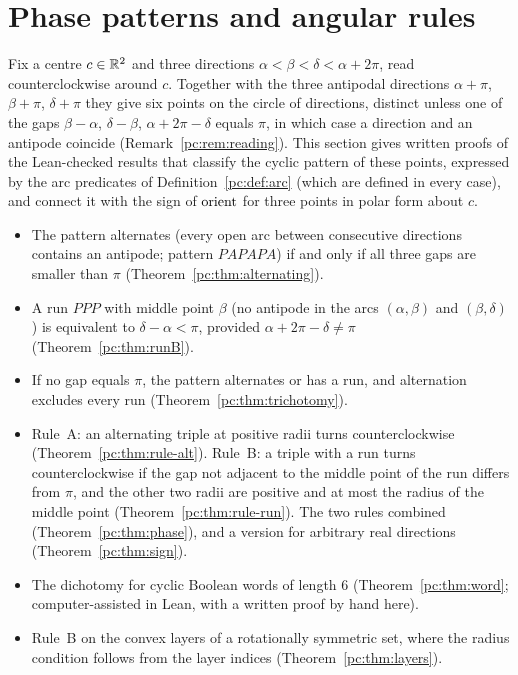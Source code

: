 \section{Phase patterns and angular rules}\label{pc:sec}
\begingroup\sloppy

Fix a centre $c\in\mathbb R^2$ and three directions $\alpha<\beta<\delta<\alpha+2\pi$, read counterclockwise around
$c$. Together with the three antipodal directions $\alpha+\pi$, $\beta+\pi$, $\delta+\pi$ they give six points on
the circle of directions, distinct unless one of the gaps $\beta-\alpha$, $\delta-\beta$, $\alpha+2\pi-\delta$
equals $\pi$, in which case a direction and an antipode coincide (Remark~\ref{pc:rem:reading}). This section gives
written proofs of the Lean-checked results that classify the cyclic pattern of these points, expressed by the arc
predicates of Definition~\ref{pc:def:arc} (which are defined in every case), and connect it with the sign of
$\operatorname{orient}$ for three points in polar form about $c$.
\begin{itemize}
\item The pattern alternates (every open arc between consecutive directions contains an antipode; pattern
  $PAPAPA$) if and only if all three gaps are smaller than $\pi$ (Theorem~\ref{pc:thm:alternating}).
\item A run $PPP$ with middle point $\beta$ (no antipode in the arcs $(\alpha,\beta)$ and $(\beta,\delta)$) is
  equivalent to $\delta-\alpha<\pi$, provided $\alpha+2\pi-\delta\neq\pi$ (Theorem~\ref{pc:thm:runB}).
\item If no gap equals $\pi$, the pattern alternates or has a run, and alternation excludes every run
  (Theorem~\ref{pc:thm:trichotomy}).
\item Rule~A: an alternating triple at positive radii turns counterclockwise (Theorem~\ref{pc:thm:rule-alt}).
  Rule~B: a triple with a run turns counterclockwise if the gap not adjacent to the middle point of the run
  differs from $\pi$, and the other two radii are positive and at most the radius of the middle point
  (Theorem~\ref{pc:thm:rule-run}). The two rules combined (Theorem~\ref{pc:thm:phase}), and a version for
  arbitrary real directions (Theorem~\ref{pc:thm:sign}).
\item The dichotomy for cyclic Boolean words of length $6$ (Theorem~\ref{pc:thm:word}; computer-assisted in
  Lean, with a written proof by hand here).
\item Rule~B on the convex layers of a rotationally symmetric set, where the radius condition follows from the
  layer indices (Theorem~\ref{pc:thm:layers}).
\end{itemize}

